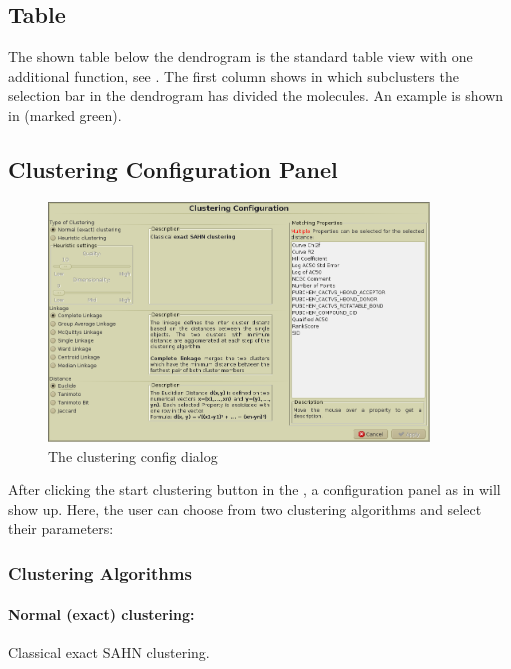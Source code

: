 \subsection{Table}
The shown table below the dendrogram is the standard table view with one additional function, see .
The first column shows in which subclusters the selection bar in the dendrogram has divided the molecules.
An example is shown in  (marked green).


\subsection{Clustering Configuration Panel}
\begin{figure}[!htb]
\centering
\includegraphics[width=0.9\textwidth]{images/dendrogram/clusteringConfig}
\caption{The clustering config dialog}
\label{fig:dendrogram_config}
\end{figure}
After clicking the start clustering button in the \sbar, a configuration panel as in  will show up.
Here, the user can choose from two clustering algorithms and select their parameters:

\subsubsection{Clustering Algorithms}
\paragraph{Normal (exact) clustering:} 
Classical exact SAHN clustering.

